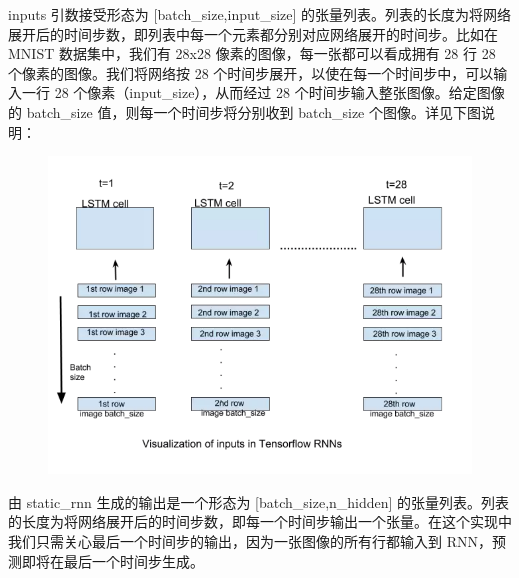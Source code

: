\documentclass{article}
\begin{document}
inputs 引数接受形态为 [batch\_size,input\_size] 的张量列表。列表的长度为将网络展开后的时间步数，即列表中每一个元素都分别对应网络展开的时间步。比如在 MNIST 数据集中，我们有 28x28 像素的图像，每一张都可以看成拥有 28 行 28 个像素的图像。我们将网络按 28 个时间步展开，以使在每一个时间步中，可以输入一行 28 个像素（input\_size），从而经过 28 个时间步输入整张图像。给定图像的 batch\_size 值，则每一个时间步将分别收到 batch\_size 个图像。详见下图说明：
\begin{figure}[H]
	\includegraphics[scale=0.5]{tf_rnn.png}
\end{figure}
由 static\_rnn 生成的输出是一个形态为 [batch\_size,n\_hidden] 的张量列表。列表的长度为将网络展开后的时间步数，即每一个时间步输出一个张量。在这个实现中我们只需关心最后一个时间步的输出，因为一张图像的所有行都输入到 RNN，预测即将在最后一个时间步生成。
\end{document}
